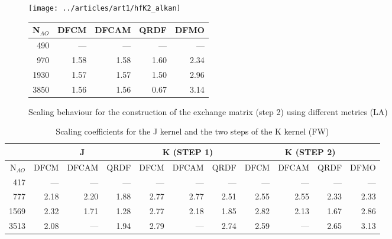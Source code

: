 %
\begin{figure}
\begin{minipage}{0.5\textwidth}
\centering
\texttt{[image: ../articles/art1/hfK2\_alkan]}
\end{minipage}
\begin{minipage}{0.3\textwidth}
\centering
\begin{tabular}{rrrrr}
\hline
N$_{AO}$ & DFCM & DFCAM & QRDF & DFMO \\ \hline
490 & --- & --- & --- & --- \\ 
970 & 1.58 & 1.58 & 1.60 & 2.34 \\ 
1930 & 1.57 & 1.57 & 1.50 & 2.96 \\ 
3850 & 1.56 & 1.56 & 0.67 & 3.14 \\ \hline
\end{tabular}
\end{minipage}
\caption{Scaling behaviour for the construction of the exchange matrix (step 2) using different metrics (LA)}
\label{fig:GS_DFK2SCALE_LA}
\end{figure}


\begin{table}
\begin{tabular}{r|rrr|rrr|rrrr}
\hline
 & \multicolumn{3}{c}{J} & \multicolumn{3}{c}{K (STEP 1)} &   \multicolumn{4}{c}{K (STEP 2)} \\ \hline
N$_{AO}$ & DFCM & DFCAM & QRDF & DFCM & DFCAM & QRDF & DFCM & DFCAM & QRDF & DFMO \\ \hline
417 & --- & --- & --- & --- & --- & --- & --- & --- & --- & --- \\ 
777 & 2.18 & 2.20 & 1.88 & 2.77 & 2.77 & 2.51 & 2.55 & 2.55 & 2.33 & 2.33 \\ 
1569 & 2.32 & 1.71 & 1.28 & 2.77 & 2.18 & 1.85 & 2.82 & 2.13 & 1.67 & 2.86 \\ 
3513 & 2.08 & --- & 1.94 & 2.79 & --- & 2.74 & 2.59 & --- & 2.65 & 3.13 \\ \hline
\end{tabular}
\caption{Scaling coefficients for the J kernel and the two steps of the K kernel (FW)}
\label{tab:GS_DFJKSCALE_FW}
\end{table}

